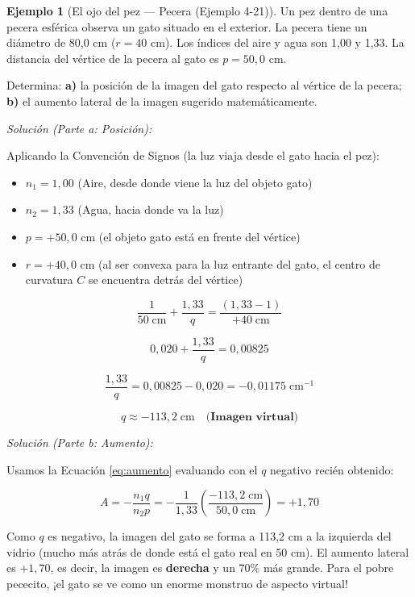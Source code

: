 \documentclass[12pt, a4paper]{article}
\theoremstyle{definition}
\newtheorem{ejemplo}{Ejemplo}[section]
\begin{document}
\begin{ejemplo}[El ojo del pez --- Pecera (Ejemplo 4-21)]
Un pez dentro de una pecera esférica observa un gato situado en el exterior. La pecera
tiene un diámetro de 80,0 cm (\(r = 40\) cm). Los índices del aire y agua son 1,00 y
1,33. La distancia del vértice de la pecera al gato es \(p = 50{,}0\) cm.

Determina: \textbf{a)} la posición de la imagen del gato respecto al vértice de la pecera;
\textbf{b)} el aumento lateral de la imagen sugerido matemáticamente.

\textit{Solución (Parte a: Posición):}

Aplicando la Convención de Signos (la luz viaja desde el gato hacia el pez):
\begin{itemize}
  \item \(n_1 = 1{,}00\) (Aire, desde donde viene la luz del objeto gato)
  \item \(n_2 = 1{,}33\) (Agua, hacia donde va la luz)
  \item \(p = +50{,}0\) cm (el objeto gato está en frente del vértice)
  \item \(r = +40{,}0\) cm (al ser convexa para la luz entrante del gato, el centro de
        curvatura \(C\) se encuentra detrás del vértice)
\end{itemize}

\[
  \frac{1}{50\;\text{cm}} + \frac{1{,}33}{q} = \frac{(1{,}33 - 1)}{+40\;\text{cm}}
\]

\[
  0{,}020 + \frac{1{,}33}{q} = 0{,}00825
\]

\[
  \frac{1{,}33}{q} = 0{,}00825 - 0{,}020 = -0{,}01175\;\text{cm}^{-1}
\]

\[
  q \approx -113{,}2\;\text{cm} \quad \textbf{(Imagen virtual)}
\]

\textit{Solución (Parte b: Aumento):}

Usamos la Ecuación \eqref{eq:aumento} evaluando con el \(q\) negativo recién obtenido:

\[
  A = -\frac{n_1 q}{n_2 p} = -\frac{1}{1{,}33}\left(\frac{-113{,}2\;\text{cm}}{50{,}0\;\text{cm}}\right)
  = +1{,}70
\]

Como \(q\) es negativo, la imagen del gato se forma a 113,2 cm a la izquierda del vidrio
(mucho más atrás de donde está el gato real en 50 cm). El aumento lateral es \(+1{,}70\),
es decir, la imagen es \textbf{derecha} y un 70\% más grande. Para el pobre pececito,
¡el gato se ve como un enorme monstruo de aspecto virtual!
\end{ejemplo}
\end{document}
